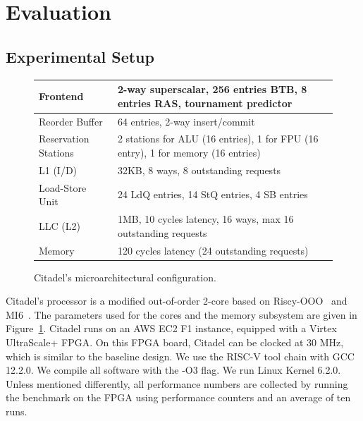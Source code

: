 \section{Evaluation}
\label{sec:eval}

\subsection{Experimental Setup}

\begin{figure}
\begin{tabular}{ | m{5em} | m{17em} | } 
  \hline
  Frontend & 2-way superscalar, 256 entries BTB, 8 entries RAS, tournament predictor \\
  \hline
  Reorder Buffer &  64 entries, 2-way insert/commit \\
  \hline
  Reservation Stations & 2 stations for ALU (16 entries), 1 for FPU (16 entry), 1 for memory (16 entries) \\
  \hline
  L1 (I/D) &  32KB, 8 ways, 8 outstanding requests \\
  \hline
  Load-Store Unit & 24 LdQ entries, 14 StQ entries, 4 SB entries\\
  \hline
  LLC (L2) & 1MB, 10 cycles latency, 16 ways, max 16 outstanding requests \\
  \hline
  Memory &  120 cycles latency (24 outstanding requests) \\
  \hline
\end{tabular}
    \caption{Citadel's microarchitectural configuration.}
    \label{tab:mi6param}
\end{figure}
Citadel's processor is a modified out-of-order 2-core based on Riscy-OOO~\cite{zhang2018composable} and MI6~\cite{bourgeat2019mi6}.
The parameters used for the cores and the memory subsystem are given in Figure~\ref{tab:mi6param}.
Citadel runs on an AWS EC2 F1 instance, equipped with a Virtex UltraScale+ FPGA. 
On this FPGA board, Citadel can be clocked at $30$ MHz, which is similar to the baseline design.
We use the RISC-V tool chain with GCC 12.2.0.
We compile all software with the -O3 flag. 
We run Linux Kernel 6.2.0.
Unless mentioned differently, all performance numbers are collected by running the benchmark on the FPGA using performance counters and an average of ten runs. 

